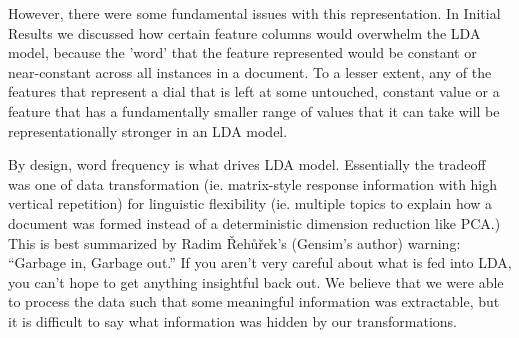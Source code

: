 However, there were some fundamental issues with this representation. In Initial Results we discussed how certain feature columns would overwhelm the LDA model, because the 'word' that the feature represented would be constant or near-constant across all instances in a document. To a lesser extent, any of the features that represent a dial that is left at some untouched, constant value or a feature that has a fundamentally smaller range of values that it can take will be representationally stronger in an LDA model.

By design, word frequency is what drives LDA model. Essentially the tradeoff was one of data transformation (ie. matrix-style response information with high vertical repetition) for linguistic flexibility (ie. multiple topics to explain how a document was formed instead of a deterministic dimension reduction like PCA.)\\

This is best summarized by Radim Řehůřek's (Gensim's author) warning: ``Garbage in, Garbage out.'' If you aren't very careful about what is fed into LDA, you can't hope to get anything insightful back out. We believe that we were able to process the data such that some meaningful information was extractable, but it is difficult to say what information was hidden by our transformations.


